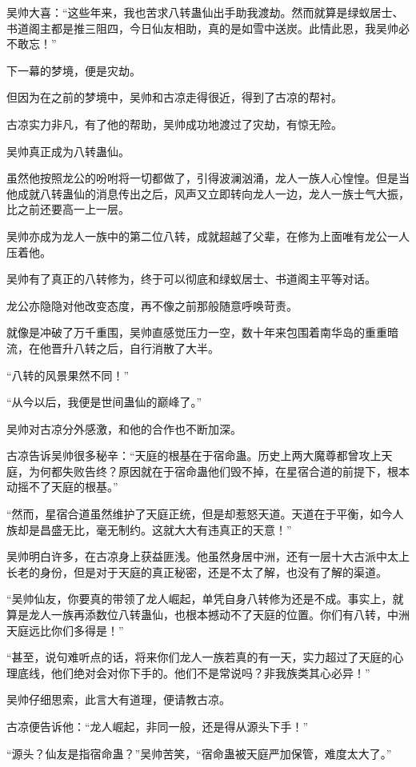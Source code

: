 \begin{this_body}
吴帅大喜：“这些年来，我也苦求八转蛊仙出手助我渡劫。然而就算是绿蚁居士、书道阁主都是推三阻四，今日仙友相助，真的是如雪中送炭。此情此恩，我吴帅必不敢忘！”

下一幕的梦境，便是灾劫。

但因为在之前的梦境中，吴帅和古凉走得很近，得到了古凉的帮衬。

古凉实力非凡，有了他的帮助，吴帅成功地渡过了灾劫，有惊无险。

吴帅真正成为八转蛊仙。

虽然他按照龙公的吩咐将一切都做了，引得波澜汹涌，龙人一族人心惶惶。但是当他成就八转蛊仙的消息传出之后，风声又立即转向龙人一边，龙人一族士气大振，比之前还要高一上一层。

吴帅亦成为龙人一族中的第二位八转，成就超越了父辈，在修为上面唯有龙公一人压着他。

吴帅有了真正的八转修为，终于可以彻底和绿蚁居士、书道阁主平等对话。

龙公亦隐隐对他改变态度，再不像之前那般随意呼唤苛责。

就像是冲破了万千重围，吴帅直感觉压力一空，数十年来包围着南华岛的重重暗流，在他晋升八转之后，自行消散了大半。

“八转的风景果然不同！”

“从今以后，我便是世间蛊仙的巅峰了。”

吴帅对古凉分外感激，和他的合作也不断加深。

古凉告诉吴帅很多秘辛：“天庭的根基在于宿命蛊。历史上两大魔尊都曾攻上天庭，为何都失败告终？原因就在于宿命蛊他们毁不掉，在星宿合道的前提下，根本动摇不了天庭的根基。”

“然而，星宿合道虽然维护了天庭正统，但是却惹怒天道。天道在于平衡，如今人族却是昌盛无比，毫无制约。这就大大有违真正的天意！”

吴帅明白许多，在古凉身上获益匪浅。他虽然身居中洲，还有一层十大古派中太上长老的身份，但是对于天庭的真正秘密，还是不太了解，也没有了解的渠道。

“吴帅仙友，你要真的带领了龙人崛起，单凭自身八转修为还是不成。事实上，就算是龙人一族再添数位八转蛊仙，也根本撼动不了天庭的位置。你们有八转，中洲天庭远比你们多得是！”

“甚至，说句难听点的话，将来你们龙人一族若真的有一天，实力超过了天庭的心理底线，他们绝对会对你下手的。他们不是常说吗？非我族类其心必异！”

吴帅仔细思索，此言大有道理，便请教古凉。

古凉便告诉他：“龙人崛起，非同一般，还是得从源头下手！”

“源头？仙友是指宿命蛊？”吴帅苦笑，“宿命蛊被天庭严加保管，难度太大了。”


\end{this_body}
